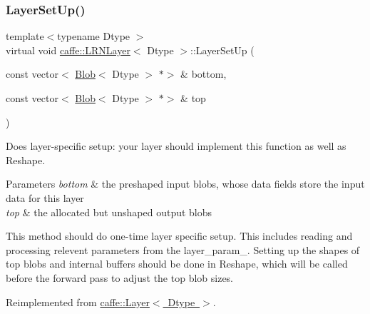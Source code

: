 \subsubsection{\texorpdfstring{Layer\+Set\+Up()}{LayerSetUp()}\hspace{0.1cm}{\footnotesize\ttfamily [1/2]}}
{\footnotesize\ttfamily template$<$typename Dtype $>$ \\
virtual void \mbox{\hyperlink{classcaffe_1_1_l_r_n_layer}{caffe\+::\+L\+R\+N\+Layer}}$<$ Dtype $>$\+::Layer\+Set\+Up (\begin{DoxyParamCaption}\item[{const vector$<$ \mbox{\hyperlink{classcaffe_1_1_blob}{Blob}}$<$ Dtype $>$ $\ast$$>$ \&}]{bottom,  }\item[{const vector$<$ \mbox{\hyperlink{classcaffe_1_1_blob}{Blob}}$<$ Dtype $>$ $\ast$$>$ \&}]{top }\end{DoxyParamCaption})\hspace{0.3cm}{\ttfamily [virtual]}}



Does layer-\/specific setup\+: your layer should implement this function as well as Reshape. 


\begin{DoxyParams}{Parameters}
{\em bottom} & the preshaped input blobs, whose data fields store the input data for this layer \\
\hline
{\em top} & the allocated but unshaped output blobs\\
\hline
\end{DoxyParams}
This method should do one-\/time layer specific setup. This includes reading and processing relevent parameters from the {\ttfamily layer\+\_\+param\+\_\+}. Setting up the shapes of top blobs and internal buffers should be done in {\ttfamily Reshape}, which will be called before the forward pass to adjust the top blob sizes. 

Reimplemented from \mbox{\hyperlink{classcaffe_1_1_layer_a481323a3e0972c682787f2137468c29f}{caffe\+::\+Layer$<$ Dtype $>$}}.

\mbox{\label{classcaffe_1_1_l_r_n_layer_ac7ae4b839d952b785b9911c258bd5b48}} 
